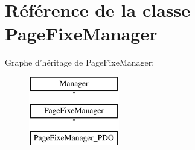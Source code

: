 \hypertarget{class_library_1_1_models_1_1_page_fixe_manager}{\section{Référence de la classe Page\+Fixe\+Manager}
\label{class_library_1_1_models_1_1_page_fixe_manager}
}
Graphe d'héritage de Page\+Fixe\+Manager\+:\begin{figure}[H]
\begin{center}
\leavevmode
\includegraphics[height=3.000000cm]{class_library_1_1_models_1_1_page_fixe_manager}
\end{center}
\end{figure}
